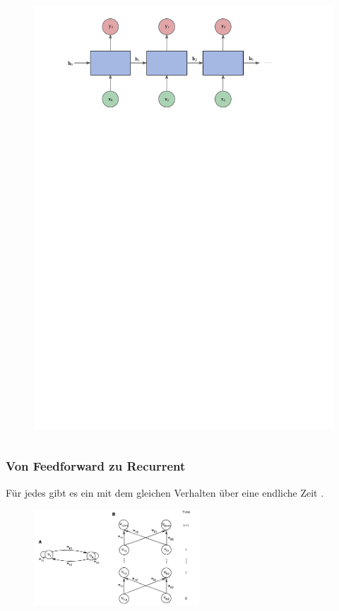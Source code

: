 \documentclass[german,aspectratio=169]{beamer}
\begin{document}
\begin{frame}
\begin{columns}
\begin{column}{0.7\textwidth}
\begin{figure}
			\includegraphics[scale=0.7]{rnn-diagram-unfold}
		\end{figure}
	\end{column}
\end{columns}
\end{frame}


\begin{frame}
	\frametitle{Von Feedforward zu Recurrent}
	\begin{theorem}
		Für jedes  gibt es ein  mit dem gleichen Verhalten über eine endliche Zeit \cite{Rumelhart1987}.
	\end{theorem}
	\begin{figure}
		\includegraphics[width=0.55\textwidth]{simplest-rnn}
	\end{figure}
\end{frame}
\end{document}

